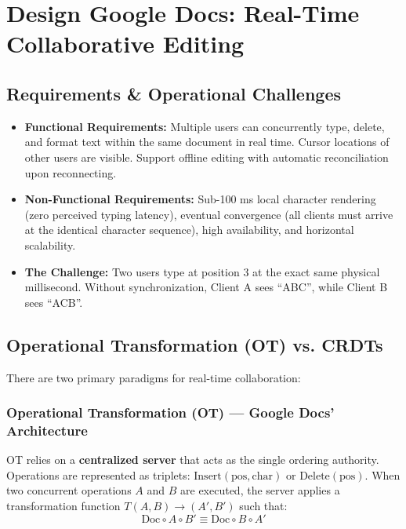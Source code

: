 \documentclass[10pt,journal,compsoc,onecolumn]{IEEEtran}
\begin{document}
\section{Design Google Docs: Real-Time Collaborative Editing}
\label{sec:google_docs}

\subsection{Requirements \& Operational Challenges}
\begin{itemize}
    \item \textbf{Functional Requirements:} Multiple users can concurrently type, delete, and format text within the same document in real time. Cursor locations of other users are visible. Support offline editing with automatic reconciliation upon reconnecting.
    \item \textbf{Non-Functional Requirements:} Sub-100 ms local character rendering (zero perceived typing latency), eventual convergence (all clients must arrive at the identical character sequence), high availability, and horizontal scalability.
    \item \textbf{The Challenge:} Two users type at position 3 at the exact same physical millisecond. Without synchronization, Client A sees ``ABC'', while Client B sees ``ACB''.
\end{itemize}

\subsection{Operational Transformation (OT) vs. CRDTs}
There are two primary paradigms for real-time collaboration:

\subsubsection{Operational Transformation (OT) --- Google Docs' Architecture}
OT relies on a \textbf{centralized server} that acts as the single ordering authority. Operations are represented as triplets: $\text{Insert}(\text{pos}, \text{char})$ or $\text{Delete}(\text{pos})$.
When two concurrent operations $A$ and $B$ are executed, the server applies a transformation function $T(A, B) \to (A', B')$ such that:
\begin{equation}
    \text{Doc} \circ A \circ B' \equiv \text{Doc} \circ B \circ A'
\end{equation}
\end{document}
